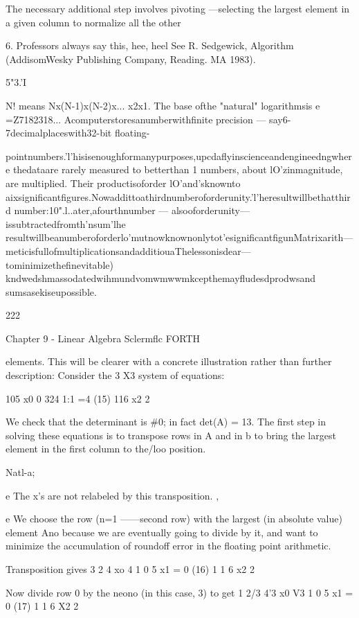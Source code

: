 {The necessary additional step involves pivoting —selecting the
largest element in a given column to normalize all the other

 

6. Professors always say this, hee, heel See R. Sedgewick, Algorithm (AddisomWesky Publishing
Company, Reading. MA 1983).

5"3.'I

N! means Nx(N-1)x(N-2)x... x2x1. The base ofthe "natural" logarithmsis e =Z7182318...
Acomputerstoresanumberwithﬁnite precision — say6-7decimalplaceswith32-bit floating-

pointnumbers.'l'hisisenoughformanypurposes,upcdaflyinscienceandengineedngwhere
thedataare rarely measured to betterthan 1%
numbers, about lO'zinmagnitude, are multiplied. Their productisoforder lO'and'sknownto
aixsigniﬁcantﬁgures.Nowaddittoathirdnumberoforderunity.'l'heresultwillbethatthird
number:10".l..ater,afourthnumber — alsooforderunity— issubtractedfromth'nsum'lhe
resultwillbeanumberoforderlo'mutnowknownonlytot'esigniﬁcantﬁgunMatrixarith—
meticisfullofmultiplicationsandadditiouaThelessonisdear— tominimizetheﬁnevitable)
kndwedshmassodatedwihmundvomwmwwmkcepthemayfludesdprodwsand
sumsasekiseupossible.

222

Chapter 9 - Linear Algebra Sclermflc FORTH

elements. This will be clearer with a concrete illustration rather
than further description: Consider the 3 X3 system of equations:

105 x0 0
324 1:1 =4 (15)
116 x2 2

We check that the determinant is \#0; in fact det(A) = 13. The ﬁrst
step in solving these equations is to transpose rows in A and in b
to bring the largest element in the ﬁrst column to the/loo position.

Natl-a;

e The x's are not relabeled by this transposition. ,

e We choose the row (n=1 ——second row) with the largest (in
absolute value) element Ano because we are eventually going
to divide by it, and want to minimize the accumulation of
roundoff error in the floating point arithmetic.

Transposition gives
3 2 4 xo 4
1 0 5 x1 = 0 (16)
1 1 6 x2 2

Now divide row 0 by the neono (in this case, 3) to get
1 2/3 4'3 x0 V3
1 0 5 x1 = 0 (17)
1 1 6 X2 2

}

